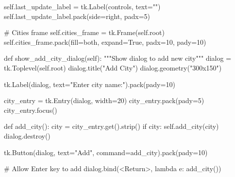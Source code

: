 \documentclass[
  letterpaper,
  DIV=11,
  numbers=noendperiod,
  oneside]{scrreprt}
\newenvironment{Shaded}{}{}
\newcommand{\CommentTok}[1]{\textcolor[rgb]{0.42,0.45,0.49}{#1}}
\newcommand{\ControlFlowTok}[1]{\textcolor[rgb]{0.84,0.23,0.29}{#1}}
\newcommand{\DecValTok}[1]{\textcolor[rgb]{0.00,0.36,0.77}{#1}}
\newcommand{\KeywordTok}[1]{\textcolor[rgb]{0.84,0.23,0.29}{#1}}
\newcommand{\NormalTok}[1]{\textcolor[rgb]{0.14,0.16,0.18}{#1}}
\newcommand{\OperatorTok}[1]{\textcolor[rgb]{0.14,0.16,0.18}{#1}}
\newcommand{\StringTok}[1]{\textcolor[rgb]{0.01,0.18,0.38}{#1}}
\newcommand{\VariableTok}[1]{\textcolor[rgb]{0.89,0.38,0.04}{#1}}
\begin{document}
\begin{Shaded}
\begin{Highlighting}[]
        \VariableTok{self}\NormalTok{.last\_update\_label }\OperatorTok{=}\NormalTok{ tk.Label(controls, text}\OperatorTok{=}\StringTok{""}\NormalTok{)}
        \VariableTok{self}\NormalTok{.last\_update\_label.pack(side}\OperatorTok{=}\StringTok{\textquotesingle{}right\textquotesingle{}}\NormalTok{, padx}\OperatorTok{=}\DecValTok{5}\NormalTok{)}
        
        \CommentTok{\# Cities frame}
        \VariableTok{self}\NormalTok{.cities\_frame }\OperatorTok{=}\NormalTok{ tk.Frame(}\VariableTok{self}\NormalTok{.root)}
        \VariableTok{self}\NormalTok{.cities\_frame.pack(fill}\OperatorTok{=}\StringTok{\textquotesingle{}both\textquotesingle{}}\NormalTok{, expand}\OperatorTok{=}\VariableTok{True}\NormalTok{, padx}\OperatorTok{=}\DecValTok{10}\NormalTok{, pady}\OperatorTok{=}\DecValTok{10}\NormalTok{)}
    
    \KeywordTok{def}\NormalTok{ show\_add\_city\_dialog(}\VariableTok{self}\NormalTok{):}
        \CommentTok{"""Show dialog to add new city"""}
\NormalTok{        dialog }\OperatorTok{=}\NormalTok{ tk.Toplevel(}\VariableTok{self}\NormalTok{.root)}
\NormalTok{        dialog.title(}\StringTok{"Add City"}\NormalTok{)}
\NormalTok{        dialog.geometry(}\StringTok{"300x150"}\NormalTok{)}
        
\NormalTok{        tk.Label(dialog, text}\OperatorTok{=}\StringTok{"Enter city name:"}\NormalTok{).pack(pady}\OperatorTok{=}\DecValTok{10}\NormalTok{)}
        
\NormalTok{        city\_entry }\OperatorTok{=}\NormalTok{ tk.Entry(dialog, width}\OperatorTok{=}\DecValTok{20}\NormalTok{)}
\NormalTok{        city\_entry.pack(pady}\OperatorTok{=}\DecValTok{5}\NormalTok{)}
\NormalTok{        city\_entry.focus()}
        
        \KeywordTok{def}\NormalTok{ add\_city():}
\NormalTok{            city }\OperatorTok{=}\NormalTok{ city\_entry.get().strip()}
            \ControlFlowTok{if}\NormalTok{ city:}
                \VariableTok{self}\NormalTok{.add\_city(city)}
\NormalTok{                dialog.destroy()}
        
\NormalTok{        tk.Button(dialog, text}\OperatorTok{=}\StringTok{"Add"}\NormalTok{, command}\OperatorTok{=}\NormalTok{add\_city).pack(pady}\OperatorTok{=}\DecValTok{10}\NormalTok{)}
        
        \CommentTok{\# Allow Enter key to add}
\NormalTok{        dialog.bind(}\StringTok{\textquotesingle{}\textless{}Return\textgreater{}\textquotesingle{}}\NormalTok{, }\KeywordTok{lambda}\NormalTok{ e: add\_city())}
    

\end{Highlighting}
\end{Shaded}
\end{document}

